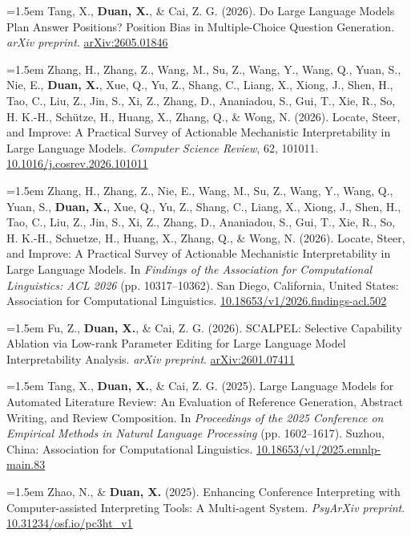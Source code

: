 \documentclass[11pt,a4paper]{article}
\begin{document}
\hangindent=1.5em  Tang, X., \textbf{Duan, X.}, \& Cai, Z. G. (2026). Do Large Language Models Plan Answer Positions? Position Bias in Multiple-Choice Question Generation. \textit{arXiv preprint}. \href{https://arxiv.org/abs/2605.01846}{arXiv:2605.01846}

\hangindent=1.5em  Zhang, H., Zhang, Z., Wang, M., Su, Z., Wang, Y., Wang, Q., Yuan, S., Nie, E., \textbf{Duan, X.}, Xue, Q., Yu, Z., Shang, C., Liang, X., Xiong, J., Shen, H., Tao, C., Liu, Z., Jin, S., Xi, Z., Zhang, D., Ananiadou, S., Gui, T., Xie, R., So, H. K.-H., Schütze, H., Huang, X., Zhang, Q., \& Wong, N. (2026). Locate, Steer, and Improve: A Practical Survey of Actionable Mechanistic Interpretability in Large Language Models. \textit{Computer Science Review}, 62, 101011. \href{https://doi.org/10.1016/j.cosrev.2026.101011}{10.1016/j.cosrev.2026.101011}

\hangindent=1.5em  Zhang, H., Zhang, Z., Nie, E., Wang, M., Su, Z., Wang, Y., Wang, Q., Yuan, S., \textbf{Duan, X.}, Xue, Q., Yu, Z., Shang, C., Liang, X., Xiong, J., Shen, H., Tao, C., Liu, Z., Jin, S., Xi, Z., Zhang, D., Ananiadou, S., Gui, T., Xie, R., So, H. K.-H., Schuetze, H., Huang, X., Zhang, Q., \& Wong, N. (2026). Locate, Steer, and Improve: A Practical Survey of Actionable Mechanistic Interpretability in Large Language Models. In \textit{Findings of the Association for Computational Linguistics: ACL 2026} (pp. 10317--10362). San Diego, California, United States: Association for Computational Linguistics. \href{https://doi.org/10.18653/v1/2026.findings-acl.502}{10.18653/v1/2026.findings-acl.502}

\hangindent=1.5em  Fu, Z., \textbf{Duan, X.}, \& Cai, Z. G. (2026). SCALPEL: Selective Capability Ablation via Low-rank Parameter Editing for Large Language Model Interpretability Analysis. \textit{arXiv preprint}. \href{https://arxiv.org/abs/2601.07411}{arXiv:2601.07411}

\hangindent=1.5em  Tang, X., \textbf{Duan, X.}, \& Cai, Z. G. (2025). Large Language Models for Automated Literature Review: An Evaluation of Reference Generation, Abstract Writing, and Review Composition. In \textit{Proceedings of the 2025 Conference on Empirical Methods in Natural Language Processing} (pp. 1602--1617). Suzhou, China: Association for Computational Linguistics. \href{https://doi.org/10.18653/v1/2025.emnlp-main.83}{10.18653/v1/2025.emnlp-main.83}

\hangindent=1.5em  Zhao, N., \& \textbf{Duan, X.} (2025). Enhancing Conference Interpreting with Computer-assisted Interpreting Tools: A Multi-agent System. \textit{PsyArXiv preprint}. \href{https://doi.org/10.31234/osf.io/pc3ht_v1}{10.31234/osf.io/pc3ht_v1}
\end{document}

